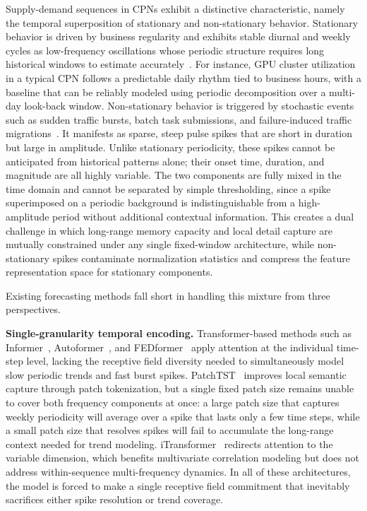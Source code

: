 \documentclass[journal]{IEEEtran}
\begin{document}
Supply-demand sequences in CPNs exhibit a distinctive
characteristic, namely the temporal superposition of stationary and non-stationary
behavior.
Stationary behavior is driven by business regularity and exhibits stable
diurnal and weekly cycles as low-frequency oscillations whose periodic
structure requires long historical windows to estimate accurately~\cite{moreno2014workload}.
For instance, GPU cluster utilization in a typical CPN follows a predictable
daily rhythm tied to business hours, with a baseline that can be reliably
modeled using periodic decomposition over a multi-day look-back window.
Non-stationary behavior is triggered by stochastic events such as sudden
traffic bursts, batch task submissions, and failure-induced traffic
migrations~\cite{alieldin2014burstiness}.
It manifests as sparse, steep pulse spikes that are short in duration but large in amplitude.
Unlike stationary periodicity, these spikes cannot be anticipated from
historical patterns alone; their onset time, duration, and magnitude are
all highly variable.
The two components are fully mixed in the time domain and cannot be
separated by simple thresholding, since a spike superimposed on a periodic
background is indistinguishable from a high-amplitude period without
additional contextual information.
This creates a dual challenge in which long-range memory capacity and local
detail capture are mutually constrained under any single fixed-window
architecture, while non-stationary spikes contaminate normalization
statistics and compress the feature representation space for stationary
components.

Existing forecasting methods fall short in handling this mixture from
three perspectives.

\textbf{Single-granularity temporal encoding.}
Transformer-based methods such as Informer~\cite{informer},
Autoformer~\cite{autoformer}, and FEDformer~\cite{fedformer} apply
attention at the individual time-step level, lacking the receptive field
diversity needed to simultaneously model slow periodic trends and fast
burst spikes.
PatchTST~\cite{patchtst} improves local semantic capture through patch
tokenization, but a single fixed patch size remains unable to cover both
frequency components at once: a large patch size that captures weekly
periodicity will average over a spike that lasts only a few time steps,
while a small patch size that resolves spikes will fail to accumulate
the long-range context needed for trend modeling.
iTransformer~\cite{itransformer} redirects attention to the variable
dimension, which benefits multivariate correlation modeling but does not
address within-sequence multi-frequency dynamics.
In all of these architectures, the model is forced to make a single
receptive field commitment that inevitably sacrifices either spike
resolution or trend coverage.
\end{document}
